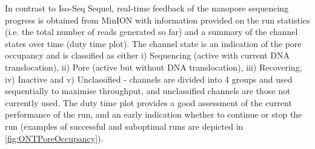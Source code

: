 \newpage
In contrast to Iso-Seq Sequel, real-time feedback of the nanopore sequencing progress is obtained from MinION with information provided on the run statistics (i.e. the total number of reads generated so far) and a summary of the channel states over time (duty time plot). The channel state is an indication of the pore occupancy and is classified as either i) Sequencing (active with current DNA translocation), ii) Pore (active but without DNA translocation), iii) Recovering, iv) Inactive and v) Unclassified - channels are divided into 4 groups and used sequentially to maximise throughput, and unclassified channels are those not currently used. The duty time plot provides a good assessment of the current performance of the run, and an early indication whether to continue or stop the run (examples of successful and suboptimal runs are depicted in \cref{fig:ONTPoreOccupancy}). 

